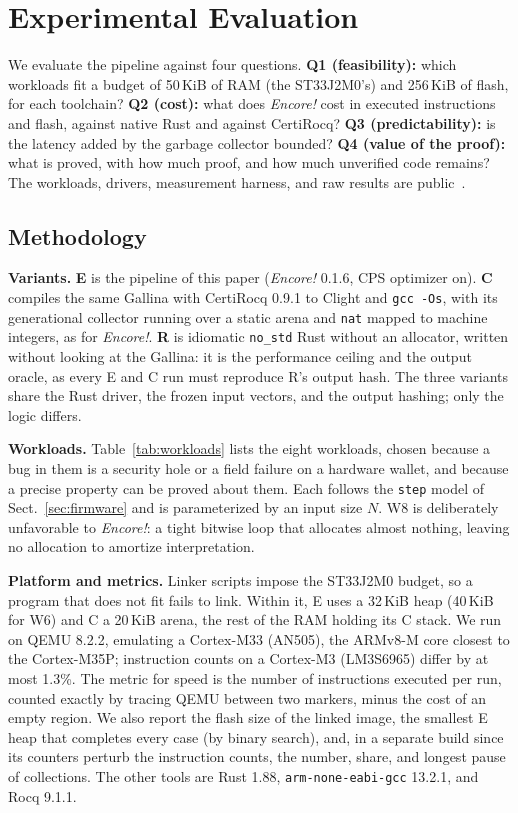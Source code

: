 \documentclass[runningheads]{llncs}
\newcommand{\encore}{\textit{Encore!}}
\newcommand{\code}[1]{\texttt{#1}}
\begin{document}
\section{Experimental Evaluation}
\label{sec:eval}

We evaluate the pipeline against four questions.
\textbf{Q1 (feasibility):} which workloads fit a budget of 50\,KiB of RAM (the ST33J2M0's) and 256\,KiB of flash, for each toolchain?
\textbf{Q2 (cost):} what does \encore{} cost in executed instructions and flash, against native Rust and against CertiRocq?
\textbf{Q3 (predictability):} is the latency added by the garbage collector bounded?
\textbf{Q4 (value of the proof):} what is proved, with how much proof, and how much unverified code remains?
The workloads, drivers, measurement harness, and raw results are public~\cite{encorebench}.

\subsection{Methodology}

\textbf{Variants.}
\textbf{E} is the pipeline of this paper (\encore{} 0.1.6, CPS optimizer on).
\textbf{C} compiles the same Gallina with CertiRocq 0.9.1 to Clight and \code{gcc -Os}, with its generational collector running over a static arena and \code{nat} mapped to machine integers, as for \encore{}.
\textbf{R} is idiomatic \code{no\_std} Rust without an allocator, written without looking at the Gallina: it is the performance ceiling and the output oracle, as every E and C run must reproduce R's output hash.
The three variants share the Rust driver, the frozen input vectors, and the output hashing; only the logic differs.

\textbf{Workloads.}
Table~\ref{tab:workloads} lists the eight workloads, chosen because a bug in them is a security hole or a field failure on a hardware wallet, and because a precise property can be proved about them.
Each follows the \code{step} model of Sect.~\ref{sec:firmware} and is parameterized by an input size $N$.
W8 is deliberately unfavorable to \encore{}: a tight bitwise loop that allocates almost nothing, leaving no allocation to amortize interpretation.

\textbf{Platform and metrics.}
Linker scripts impose the ST33J2M0 budget, so a program that does not fit fails to link.
Within it, E uses a 32\,KiB heap (40\,KiB for W6) and C a 20\,KiB arena, the rest of the RAM holding its C stack.
We run on QEMU 8.2.2, emulating a Cortex-M33 (AN505), the ARMv8-M core closest to the Cortex-M35P; instruction counts on a Cortex-M3 (LM3S6965) differ by at most 1.3\%.
The metric for speed is the number of instructions executed per run, counted exactly by tracing QEMU between two markers, minus the cost of an empty region.
We also report the flash size of the linked image, the smallest E heap that completes every case (by binary search), and, in a separate build since its counters perturb the instruction counts, the number, share, and longest pause of collections.
The other tools are Rust 1.88, \code{arm-none-eabi-gcc} 13.2.1, and Rocq 9.1.1.
\end{document}
